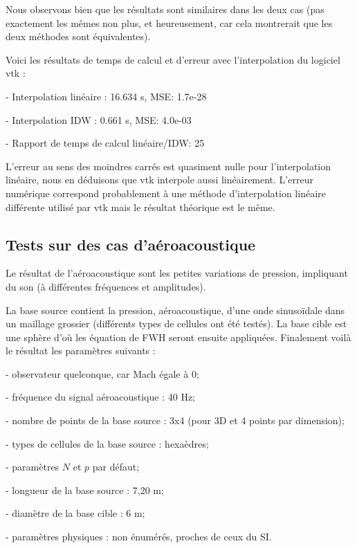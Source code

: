 Nous observons bien que les résultats sont similaires dans les deux cas (pas exactement les mêmes non plus, et heureusement, car cela montrerait que les deux méthodes sont équivalentes).

Voici les résultats de temps de calcul et d'erreur avec l'interpolation du logiciel vtk :

- Interpolation linéaire :         16.634 s, MSE: 1.7e-28

- Interpolation IDW :\hspace{0,4cm} 0.661 s, MSE: 4.0e-03

- Rapport de temps de calcul linéaire/IDW: 25

L'erreur au sens des moindres carrés est quasiment nulle pour l'interpolation linéaire, nous en déduisons que vtk interpole aussi linéairement. L'erreur numérique correspond probablement à une méthode d'interpolation linéaire différente utilisé par vtk mais le résultat théorique est le même.

\subsection{Tests sur des cas d'aéroacoustique}

Le résultat de l'aéroacoustique sont les petites variations de pression, impliquant du son (à différentes fréquences et amplitudes).

La base source contient la pression, aéroacoustique, d'une onde sinusoïdale dans un maillage grossier (différents types de cellules ont été testés). La base cible est une sphère d'où les équation de FWH seront ensuite appliquées. Finalement voilà le résultat les paramètres suivants :

- observateur quelconque, car Mach égale à 0;

- fréquence du signal aéroacoustique : 40 Hz;

- nombre de points de la base source : 3x4 (pour 3D et 4 points par dimension);

- types de cellules de la base source : hexaèdres;

- paramètres \(N\) et \(p\) par défaut;

- longueur de la base source : 7,20 m;

- diamètre de la base cible : 6 m;

- paramètres physiques : non énumérés, proches de ceux du \ac{SI}. 

